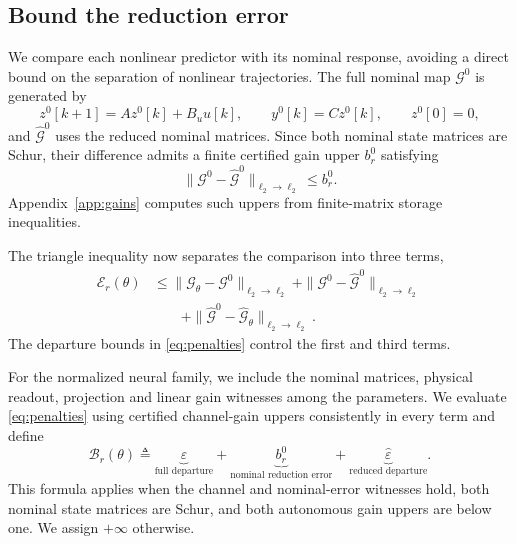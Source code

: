 \documentclass{l4dc2027}
\newcommand{\eqdef}{\triangleq}
\begin{document}
\subsection{Bound the reduction error}
We compare each nonlinear predictor with its nominal response, avoiding a direct bound on the separation of nonlinear trajectories.
The full nominal map \mbox{$\mathcal G^0$} is generated by
\begin{equation}\label{eq:nominal}
 z^0[k+1]=Az^0[k]+B_uu[k],\qquad
 y^0[k]=Cz^0[k],\qquad z^0[0]=0,
\end{equation}
and \mbox{$\widehat{\mathcal G}^0$} uses the reduced nominal matrices.
Since both nominal state matrices are Schur, their difference admits a finite certified gain upper \mbox{$b_r^0$} satisfying
\begin{equation}\label{eq:nominal-error-upper}
 \|\mathcal G^0-\widehat{\mathcal G}^0\|_{\ell_2\to\ell_2}\le b_r^0.
\end{equation}
Appendix~\ref{app:gains} computes such uppers from finite-matrix storage inequalities.

The triangle inequality now separates the comparison into three terms,
\[
 \begin{aligned}
 \mathcal E_r(\theta)
 &\le
 \|\mathcal G_\theta-\mathcal G^0\|_{\ell_2\to\ell_2}
 +\|\mathcal G^0-\widehat{\mathcal G}^0\|_{\ell_2\to\ell_2}\\
 &\qquad+
 \|\widehat{\mathcal G}^0-\widehat{\mathcal G}_\theta\|_{\ell_2\to\ell_2}.
 \end{aligned}
\]
The departure bounds in \eqref{eq:penalties} control the first and third terms.

\begin{definition}\label{def:constructed-certificate}
For the normalized neural family, we include the nominal matrices, physical readout, projection and linear gain witnesses among the parameters.
We evaluate \eqref{eq:penalties} using certified channel-gain uppers consistently in every term and define
\begin{equation}\label{eq:certificate}
 \mathcal B_r(\theta)\eqdef
 \underbrace{\varepsilon}_{\text{full departure}}+
 \underbrace{b_r^0}_{\text{nominal reduction error}}+
 \underbrace{\widehat\varepsilon}_{\text{reduced departure}}.
\end{equation}
This formula applies when the channel and nominal-error witnesses hold, both nominal state matrices are Schur, and both autonomous gain uppers are below one.
We assign \mbox{$+\infty$} otherwise.
\end{definition}
\end{document}
